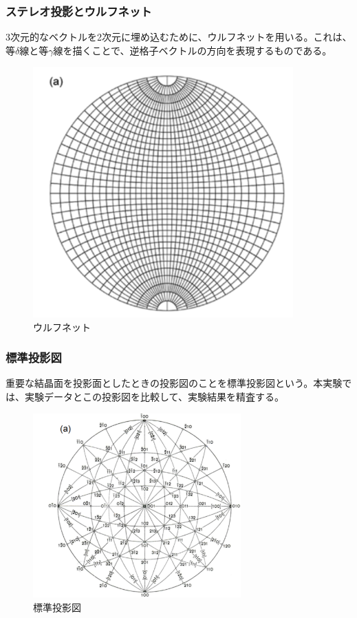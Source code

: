 \documentclass[a4paper,11pt]{jsarticle}
\begin{document}
\subsubsection{ステレオ投影とウルフネット}
3次元的なベクトルを2次元に埋め込むために、ウルフネットを用いる。これは、等$\delta$線と等$\gamma$線を描くことで、逆格子ベクトルの方向を表現するものである。
\begin{figure}[H]
    \begin{center}
    \includegraphics[width=100mm]{u.png}
    \end{center}
    \caption{ウルフネット}
    \label{fig:u}
\end{figure}

\subsubsection{標準投影図}
重要な結晶面を投影面としたときの投影図のことを標準投影図という。本実験では、実験データとこの投影図を比較して、実験結果を精査する。
\begin{figure}[H]
    \begin{center}
    \includegraphics[width=80mm]{standard.png}
    \end{center}
    \caption{標準投影図}
    \label{fig:standard}
\end{figure}
\end{document}
